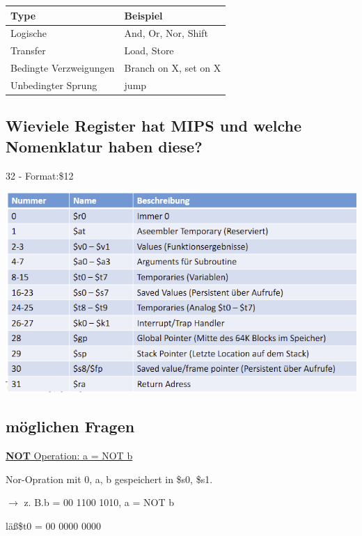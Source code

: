 \documentclass[fleqn]{article}
\begin{document}
\begin{center}
    \begin{tabular}{|l|l|}
        \hline
        Type&Beispiel\\
        \hline
        Logische&And, Or, Nor, Shift\\
        \hline
        Transfer&Load, Store\\
        \hline
        Bedingte Verzweigungen&Branch on X, set on X\\
        \hline
        Unbedingter Sprung&jump\\
        \hline
    \end{tabular}
\end{center}

\subsection{Wieviele Register hat MIPS und welche Nomenklatur haben diese?}

32 - Format:\$12

\begin{center}
    \includegraphics[scale=0.5]{24.png}
\end{center}

\subsection{möglichen Fragen}

\noindent\underline{\textbf{NOT} Operation: a = NOT b}

Nor-Opration mit 0, a, b gespeichert in \$s0, \$s1.

$\rightarrow$ z. B.\qquad b = 00 1100 1010, a = NOT b

\indent\indent läß\qquad  \$t0 = 00 0000 0000
\end{document}
